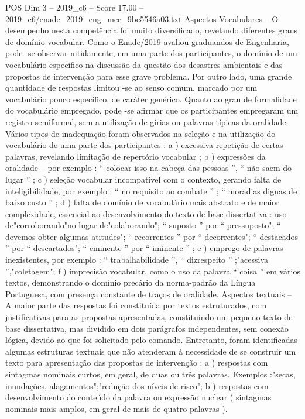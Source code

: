 \begin{textsample}{POS Dim 3 – 2019\_c6 – Score 17.00 – 2019\_c6/enade\_2019\_eng\_mec\_9be5546a03.txt}
Aspectos Vocabulares – O desempenho nesta competência foi muito diversificado, revelando diferentes graus de domínio vocabular.
Como o Enade/2019 avaliou graduandos de Engenharia, pode -se observar nitidamente, em uma parte dos participantes, o domínio de um vocabulário específico na discussão da questão dos desastres ambientais e das propostas de intervenção para esse grave problema.
Por outro lado, uma grande quantidade de respostas limitou -se ao senso comum, marcado por um vocabulário pouco específico, de caráter genérico.
Quanto ao grau de formalidade do vocabulário empregado, pode -se afirmar que os participantes empregaram um registro semiformal, sem a utilização de gírias ou palavras típicas da oralidade.
Vários tipos de inadequação foram observados na seleção e na utilização do vocabulário de uma parte dos participantes : a ) excessiva repetição de certas palavras, revelando limitação de repertório vocabular ; b ) expressões da oralidade – por exemplo : “ colocar isso na cabeça das pessoas ”, “ não saem do lugar ” ; c ) seleção vocabular incompatível com o contexto, gerando falta de inteligibilidade, por exemplo : “ no requisito ao combate ” ; “ moradias dignas de baixo custo ” ; d ) falta de domínio de vocabulário mais abstrato e de maior complexidade, essencial ao desenvolvimento do texto de base dissertativa : uso de"corroborando"no lugar de"colaborando"; “ suposto ” por “ pressuposto"; “ devemos obter algumas atitudes"; “ recorrentes ” por “ decorrentes"; “ destacados ” por “ descartados"; “ eminente ” por “ iminente ” ; e ) emprego de palavras inexistentes, por exemplo : “ trabalhabilidade ”, “ dizrespeito ” ;"acessiva ”,"coletagem"; f ) imprecisão vocabular, como o uso da palavra “ coisa ” em vários textos, demonstrando o domínio precário da norma-padrão da Língua Portuguesa, com presença constante de traços de oralidade.
Aspectos textuais – A maior parte das respostas foi constituída por textos estruturados, com justificativas para as propostas apresentadas, constituindo um pequeno texto de base dissertativa, mas dividido em dois parágrafos independentes, sem conexão lógica, devido ao que foi solicitado pelo comando.
Entretanto, foram identificadas algumas estruturas textuais que não atenderam à necessidade de se construir um texto para apresentação das propostas de intervenção : a ) respostas com sintagmas nominais curtos, em geral, de duas ou três palavras.
Exemplos :"secas, inundações, alagamentos";"redução dos níveis de risco"; b ) respostas com desenvolvimento do conteúdo da palavra ou expressão nuclear ( sintagmas nominais mais amplos, em geral de mais de quatro palavras ).

\end{textsample}
